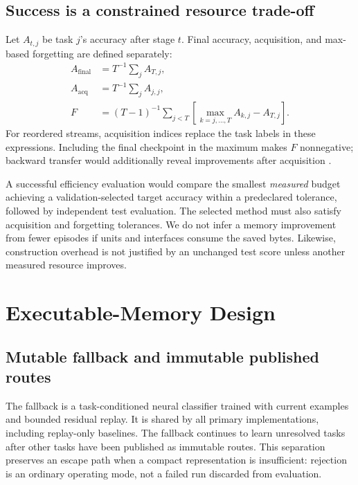 \documentclass{article}
\begin{document}
\subsection{Success is a constrained resource trade-off}
Let $A_{t,j}$ be task $j$'s accuracy after stage $t$. Final accuracy, acquisition, and max-based forgetting are defined separately:
\begin{align}
A_{\mathrm{final}}&=T^{-1}\textstyle\sum_j A_{T,j},\\
A_{\mathrm{acq}}&=T^{-1}\textstyle\sum_j A_{j,j},\\
F&=(T-1)^{-1}\textstyle\sum_{j<T}\left[\max_{k=j,\ldots,T} A_{k,j}-A_{T,j}\right].
\end{align}
For reordered streams, acquisition indices replace the task labels in these expressions. Including the final checkpoint in the maximum makes $F$ nonnegative; backward transfer would additionally reveal improvements after acquisition \cite{lopez2017}.

A successful efficiency evaluation would compare the smallest \emph{measured} budget achieving a validation-selected target accuracy within a predeclared tolerance, followed by independent test evaluation. The selected method must also satisfy acquisition and forgetting tolerances. We do not infer a memory improvement from fewer episodes if units and interfaces consume the saved bytes. Likewise, construction overhead is not justified by an unchanged test score unless another measured resource improves.

\section{Executable-Memory Design}
\label{sec:design}
\subsection{Mutable fallback and immutable published routes}
The fallback is a task-conditioned neural classifier trained with current examples and bounded residual replay. It is shared by all primary implementations, including replay-only baselines. The fallback continues to learn unresolved tasks after other tasks have been published as immutable routes. This separation preserves an escape path when a compact representation is insufficient: rejection is an ordinary operating mode, not a failed run discarded from evaluation.
\end{document}
